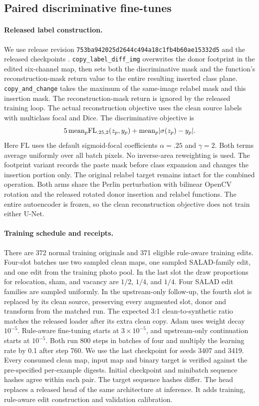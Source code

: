 \subsection{Paired discriminative fine-tunes}
\paragraph{Released label construction.}
We use release revision \texttt{753ba942025d2644c494a18c1fb4b60ae15332d5} and the released checkpoints \cite{fucka2025}. \texttt{copy\_label\_diff\_img} overwrites the donor footprint in the edited six-channel map, then sets both the discriminative mask and the function's reconstruction-mask return value to the entire resulting inserted class plane. \texttt{copy\_and\_change} takes the maximum of the same-image relabel mask and this insertion mask. The reconstruction-mask return is ignored by the released training loop. The actual reconstruction objective uses the clean source labels with multiclass focal and Dice. The discriminative objective is
\[
  5\,{\rm mean}_{p}{\rm FL}_{.25,2}(z_p,y_p)
  + {\rm mean}_{p}|\sigma(z_p)-y_p|.
\]
Here $\mathrm{FL}$ uses the default sigmoid-focal coefficients $\alpha=.25$ and $\gamma=2$. Both terms average uniformly over all batch pixels. No inverse-area reweighting is used. The footprint variant records the paste mask before class expansion and changes the insertion portion only. The original relabel target remains intact for the combined operation. Both arms share the Perlin perturbation with bilinear OpenCV rotation and the released rotated donor insertion and relabel functions. The entire autoencoder is frozen, so the clean reconstruction objective does not train either U-Net.

\paragraph{Training schedule and receipts.}
There are 372 normal training originals and 371 eligible rule-aware training edits. Four-slot batches use two sampled clean maps, one sampled SALAD-family edit, and one edit from the training photo pool. In the last slot the draw proportions for relocation, sham, and vacancy are $1/2$, $1/4$, and $1/4$. Four SALAD edit families are sampled uniformly. In the upstream-only follow-up, the fourth slot is replaced by its clean source, preserving every augmented slot, donor and transform from the matched run. The expected 3:1 clean-to-synthetic ratio matches the released loader after its extra clean copy. Adam uses weight decay $10^{-5}$. Rule-aware fine-tuning starts at $3{\times}10^{-5}$, and upstream-only continuation starts at $10^{-5}$. Both run 800 steps in batches of four and multiply the learning rate by 0.1 after step 760. We use the last checkpoint for seeds 3407 and 3419. Every consumed clean map, input map and binary target is verified against the pre-specified per-example digests. Initial checkpoint and minibatch sequence hashes agree within each pair. The target sequence hashes differ. The head replaces a released head of the same architecture at inference. It adds training, rule-aware edit construction and validation calibration.

